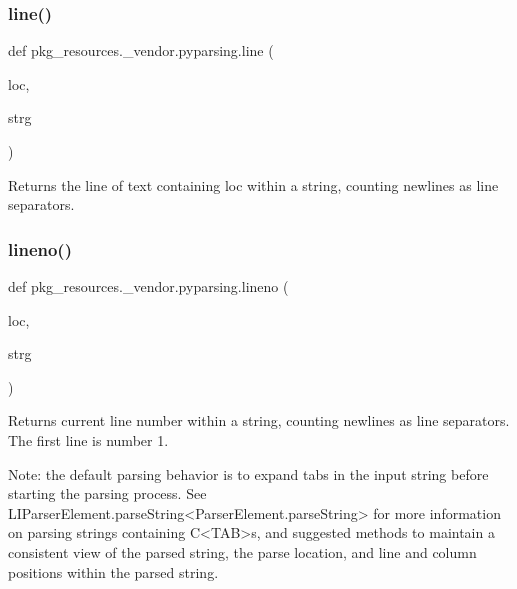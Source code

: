 \subsubsection{\texorpdfstring{line()}{line()}}
{\footnotesize\ttfamily def pkg\+\_\+resources.\+\_\+vendor.\+pyparsing.\+line (\begin{DoxyParamCaption}\item[{}]{loc,  }\item[{}]{strg }\end{DoxyParamCaption})}

\begin{DoxyVerb}Returns the line of text containing loc within a string, counting newlines as line separators.\end{DoxyVerb}
 \mbox{\label{namespacepkg__resources_1_1__vendor_1_1pyparsing_a0069c6f322a84243b4f42b7514a0276b}} 
\subsubsection{\texorpdfstring{lineno()}{lineno()}}
{\footnotesize\ttfamily def pkg\+\_\+resources.\+\_\+vendor.\+pyparsing.\+lineno (\begin{DoxyParamCaption}\item[{}]{loc,  }\item[{}]{strg }\end{DoxyParamCaption})}

\begin{DoxyVerb}Returns current line number within a string, counting newlines as line separators.
   The first line is number 1.

   Note: the default parsing behavior is to expand tabs in the input string
   before starting the parsing process.  See L{I{ParserElement.parseString}<ParserElement.parseString>} for more information
   on parsing strings containing C{<TAB>}s, and suggested methods to maintain a
   consistent view of the parsed string, the parse location, and line and column
   positions within the parsed string.\end{DoxyVerb}
 \mbox{\label{namespacepkg__resources_1_1__vendor_1_1pyparsing_a75102217255183b87789306aa8e311e6}} 
